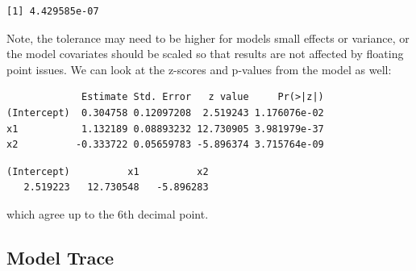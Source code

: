 \documentclass[]{elsarticle} %
\newenvironment{Shaded}{\begin{snugshade}}{\end{snugshade}}
\newcommand{\KeywordTok}[1]{\textcolor[rgb]{0.13,0.29,0.53}{\textbf{#1}}}
\newcommand{\NormalTok}[1]{#1}
\newcommand{\OperatorTok}[1]{\textcolor[rgb]{0.81,0.36,0.00}{\textbf{#1}}}
\newcommand{\StringTok}[1]{\textcolor[rgb]{0.31,0.60,0.02}{#1}}
\begin{document}
\begin{Shaded}
\end{Shaded}

\begin{verbatim}
[1] 4.429585e-07
\end{verbatim}

Note, the tolerance may need to be higher for models small effects or variance, or the model covariates should be scaled so that results are not affected by floating point issues. We can look at the z-scores and p-values from the model as well:

\begin{Shaded}
\end{Shaded}

\begin{verbatim}
             Estimate Std. Error   z value     Pr(>|z|)
(Intercept)  0.304758 0.12097208  2.519243 1.176076e-02
x1           1.132189 0.08893232 12.730905 3.981979e-37
x2          -0.333722 0.05659783 -5.896374 3.715764e-09
\end{verbatim}

\begin{Shaded}
\end{Shaded}

\begin{verbatim}
(Intercept)          x1          x2 
   2.519223   12.730548   -5.896283 
\end{verbatim}

which agree up to the 6th decimal point.

\hypertarget{model-trace}{%
\subsection{Model Trace}\label{model-trace}}
\end{document}
